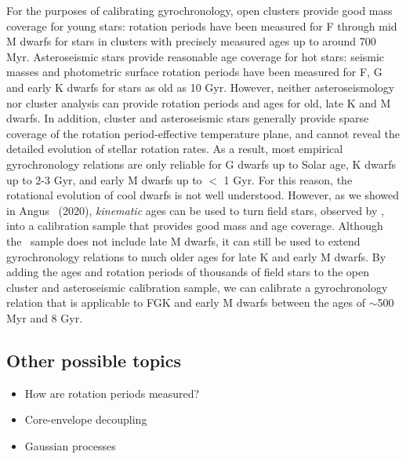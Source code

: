 For the purposes of calibrating gyrochronology, open clusters provide good
mass coverage for young stars: rotation periods have been measured for F
through mid M dwarfs for stars in clusters with precisely measured ages up to
around 700 Myr.
Asteroseismic stars provide reasonable age coverage for hot stars: seismic
masses and photometric surface rotation periods have been measured for F, G
and early K dwarfs for stars as old as 10 Gyr.
However, neither asteroseismology nor cluster analysis can provide rotation
periods and ages for old, late K and M dwarfs.
In addition, cluster and asteroseismic stars generally provide sparse coverage
of the rotation period-effective temperature plane, and cannot reveal the
detailed evolution of stellar rotation rates.
As a result, most empirical gyrochronology relations are only reliable for G
dwarfs up to Solar age, K dwarfs up to 2-3 Gyr, and early M dwarfs up to $<$ 1
Gyr.
For this reason, the rotational evolution of cool dwarfs is not well
understood.
However, as we showed in Angus \etal\ (2020), {\it kinematic} ages can be used
to turn field stars, observed by \kepler, into a calibration sample that
provides good mass and age coverage.
Although the \kepler\ sample does not include late M dwarfs, it can still be
used to extend gyrochronology relations to much older ages for late K and
early M dwarfs.
By adding the ages and rotation periods of thousands of field stars to the
open cluster and asteroseismic calibration sample, we can calibrate a
gyrochronology relation that is applicable to FGK and early M dwarfs between
the ages of $\sim$500 Myr and 8 Gyr.

\subsection{Other possible topics}
\begin{itemize}
\item{How are rotation periods measured?}
\item{Core-envelope decoupling}
\item{Gaussian processes}
\end{itemize}

